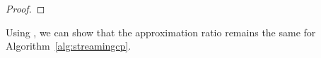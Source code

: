 \begin{proof}
\end{proof}

Using , we can show that the approximation ratio remains the same for Algorithm~\ref{alg:streamingcp}.

